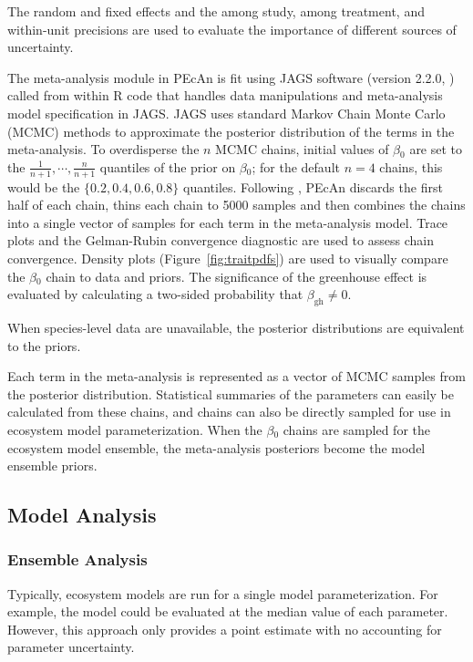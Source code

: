 \documentclass[12pt]{article}
\begin{document}
\begin{flushleft}
\begin{spacing}{1.9}
 The random and fixed effects and the among study, among treatment, and within-unit precisions are used to evaluate the importance of different sources of uncertainty.

 The meta-analysis module in PEcAn is fit using JAGS software (version 2.2.0, \citep{plummer2010jv2}) called from within R code that handles data manipulations and meta-analysis model specification in JAGS. 
 JAGS uses standard Markov Chain Monte Carlo (MCMC) methods \citep{gelman1992ifi} to approximate the posterior distribution of the terms in the meta-analysis.
 To overdisperse the $n$ MCMC chains, initial values of $\beta{_0}$ are set to the $\frac1{n+1},\cdots,\frac n{n+1}$ quantiles of the prior on $\beta{_0}$; for the default $n=4$ chains, this would be the $\{0.2,0.4,0.6,0.8\}$ quantiles.
 Following \citet{gelman2011ifs}, PEcAn discards the first half of each chain, thins each chain to 5000 samples and then combines the chains into a single vector of samples for each term in the meta-analysis model.
 Trace plots and the Gelman-Rubin convergence diagnostic \citep{gelman1992ifi} are used to assess chain convergence.
 Density plots (Figure~\ref{fig:traitpdfs}) are used to visually compare the $\beta{_0}$ chain to data and priors. 
 The significance of the greenhouse effect is evaluated by calculating a two-sided probability that $\beta_{\text{gh}}\neq0$.

 When species-level data are unavailable, the posterior distributions are equivalent to the priors.

 Each term in the meta-analysis is represented as a vector of MCMC samples from the posterior distribution.
 Statistical summaries of the parameters can easily be calculated from these chains, and chains can also be directly sampled for use in ecosystem model parameterization.
 When the $\beta{_0}$ chains are sampled for the ecosystem model ensemble, the meta-analysis posteriors become the model ensemble priors.

\subsection*{Model Analysis}

\subsubsection*{Ensemble Analysis}
 Typically, ecosystem models are run for a single model parameterization.
 For example, the model could be evaluated at the median value of each parameter. 
 However, this approach only provides a point estimate with no accounting for parameter uncertainty.


\end{spacing}
\end{flushleft}
\end{document}
